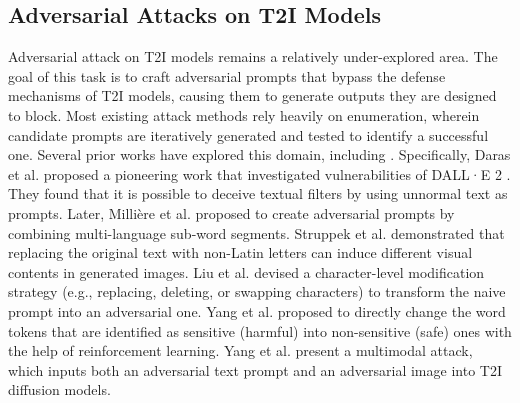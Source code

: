 \subsection{Adversarial Attacks on T2I Models}



Adversarial attack on T2I models remains a relatively under-explored area. The goal of this task is to craft adversarial prompts that bypass the defense mechanisms of T2I models, causing them to generate outputs they are designed to block. Most existing attack methods rely heavily on enumeration, wherein candidate prompts are iteratively generated and tested to identify a successful one. Several prior works have explored this domain, including \cite{daras2022discovering,ramesh2022hierarchical,milliere2022adversarial,struppek2022biased,liu2023riatig,yang2024sneakyprompt,yang2023mma}.
Specifically, Daras et al. \cite{daras2022discovering} proposed a pioneering work that investigated vulnerabilities of DALL·E 2 \cite{ramesh2022hierarchical}. 
They found that it is possible to deceive textual filters by using unnormal text as prompts. 
Later, Milli{\`e}re et al. \cite{milliere2022adversarial} proposed to create adversarial prompts by combining multi-language sub-word segments.
Struppek et al. \cite{struppek2022biased} demonstrated that replacing the original text with non-Latin letters can induce different visual contents in generated images. 
Liu et al. \cite{liu2023riatig} devised a character-level modification strategy (e.g., replacing, deleting, or swapping characters) to transform  the naive prompt into an adversarial one.
Yang et al. \cite{yang2024sneakyprompt} proposed to directly change the word tokens that are identified as sensitive (harmful) into non-sensitive (safe) ones with the help of reinforcement learning.
Yang et al. \cite{yang2023mma} present a multimodal attack, which inputs both an adversarial text prompt and an adversarial image into T2I diffusion models.


